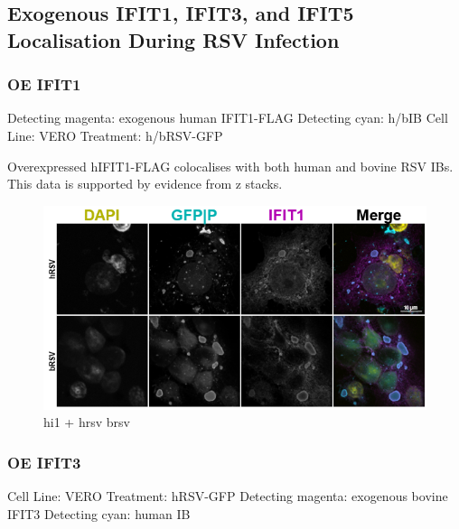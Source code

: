 \subsection{Exogenous IFIT1, IFIT3, and IFIT5 Localisation  During RSV Infection} \label{subsec:Exogenous IFIT1, IFIT3, and IFIT5 Localisation  During RSV Infection}
\subsubsection{OE IFIT1}
Detecting magenta: exogenous human IFIT1-FLAG \newline
Detecting cyan: h/bIB \newline
Cell Line: VERO \newline
Treatment: h/bRSV-GFP \newline

Overexpressed hIFIT1-FLAG colocalises with both human and bovine RSV IBs. This data is supported by evidence from z stacks.

\begin{figure}
    \centering
    \includegraphics[width=1\linewidth]{09. Chapter 4/Figs/04. Overexpression/01. hi1 hrsv brsv.png}
    \caption[hi1 + hrsv brsv]{hi1 + hrsv brsv}
    \label{fig:hi1 + hrsv brsv}
\end{figure}

\subsubsection{OE IFIT3}
Cell Line: VERO \newline
Treatment: hRSV-GFP \newline
Detecting magenta: exogenous bovine IFIT3 \newline
Detecting cyan: human IB \newline

